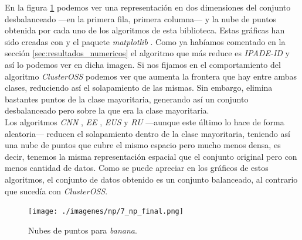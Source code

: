 En la figura \ref{img:np} podemos ver una representación en dos dimensiones del conjunto desbalanceado —en la primera fila, primera columna— y la nube de puntos obtenida por cada uno de los algoritmos de esta biblioteca. Estas gráficas han sido creadas con \cite{pythonweb} y el paquete \textit{matplotlib} \cite{matplotlib}. Como ya habíamos comentado en la sección \ref{sec:resultados_numericos} el algoritmo que más reduce es \textit{IPADE-ID} \cite{ipade} y así lo podemos ver en dicha imagen. Si nos fijamos en el comportamiento del algoritmo \textit{ClusterOSS} \cite{clusteross} podemos ver que aumenta la frontera que hay entre ambas clases, reduciendo así el solapamiento de las mismas. Sin embargo, elimina bastantes puntos de la clase mayoritaria, generando así un conjunto desbalanceado pero sobre la que era la clase mayoritaria. \\

Los algoritmos \textit{CNN} \cite{cnn}, \textit{EE} \cite{bc-ee}, \textit{EUS} \cite{eus} y \textit{RU} —aunque este último lo hace de forma aleatoria— reducen el solapamiento dentro de la clase mayoritaria, teniendo así una nube de puntos que cubre el mismo espacio pero mucho menos densa, es decir, tenemos la misma representación espacial que el conjunto original pero con menos cantidad de datos. Como se puede apreciar en los gráficos de estos algoritmos, el conjunto de datos obtenido es un conjunto balanceado, al contrario que sucedía con \textit{ClusterOSS}.

\newpage

\begin{figure}[H]
	\texttt{[image: ./imagenes/np/7\_np\_final.png]}
	\caption{Nubes de puntos para \textit{banana}.}
	\label{img:np}
\end{figure}